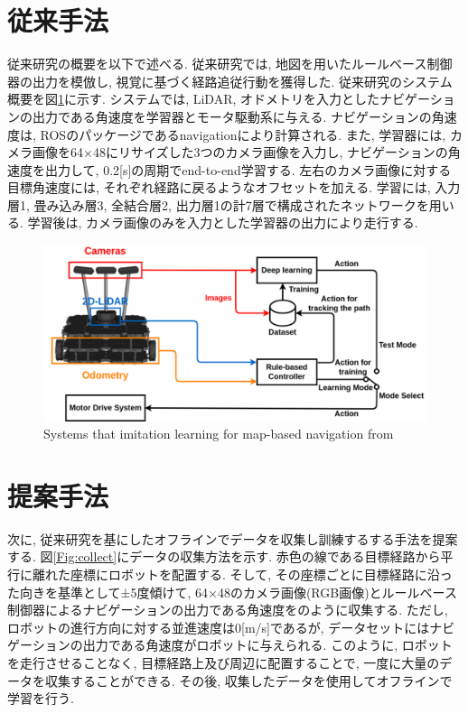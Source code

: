 \documentclass[10pt]{ujarticle}
\begin{document}
    \section{従来手法}%
    従来研究の概要を以下で述べる. 従来研究では, 地図を用いたルールベース制御器の出力を模倣し, 視覚に基づく経路追従行動を獲得した. 従来研究のシステム概要を図\ref{Fig:si2020-okada}に示す. システムでは, LiDAR, オドメトリを入力としたナビゲーションの出力である角速度を学習器とモータ駆動系に与える. ナビゲーションの角速度は, ROSのパッケージであるnavigation\cite{navigation}により計算される. また, 学習器には, カメラ画像を64×48にリサイズした3つのカメラ画像を入力し, ナビゲーションの角速度を出力して, 0.2[s]の周期でend-to-end学習する. 左右のカメラ画像に対する目標角速度には, それぞれ経路に戻るようなオフセットを加える. 学習には, 入力層1, 畳み込み層3, 全結合層2, 出力層1の計7層で構成されたネットワークを用いる. 学習後は, カメラ画像のみを入力とした学習器の出力により走行する. 

    \begin{figure}[h]
        \centering
        \includegraphics[keepaspectratio, scale=0.33]{fig/okada.pdf}
        \caption{Systems that imitation learning for map-based navigation from\cite{si2020-okada}}
        \label{Fig:si2020-okada}
    \end{figure}

    \section{提案手法}%
    次に, 従来研究を基にしたオフラインでデータを収集し訓練するする手法を提案する. 図\ref{Fig:collect}にデータの収集方法を示す. 赤色の線である目標経路から平行に離れた座標にロボットを配置する. そして, その座標ごとに目標経路に沿った向きを基準として±5度傾けて, 64×48のカメラ画像(RGB画像)とルールベース制御器によるナビゲーションの出力である角速度をのように収集する. ただし, ロボットの進行方向に対する並進速度は0[m/s]であるが, データセットにはナビゲーションの出力である角速度がロボットに与えられる. このように, ロボットを走行させることなく, 目標経路上及び周辺に配置することで, 一度に大量のデータを収集することができる. その後, 収集したデータを使用してオフラインで学習を行う. 
\end{document}
